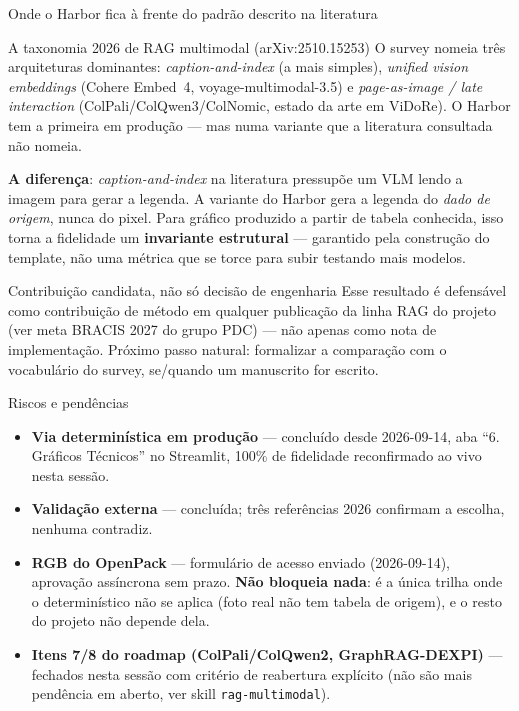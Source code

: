 \documentclass{beamer}
\newenvironment{numerobloco}[1]{\begin{block}{#1}}{\end{block}}
\newenvironment{decisaobloco}[1]{\begin{alertblock}{#1}}{\end{alertblock}}
\begin{document}
\begin{frame}{Onde o Harbor fica à frente do padrão descrito na literatura}
  \small
  \begin{numerobloco}{A taxonomia 2026 de RAG multimodal (arXiv:2510.15253)}
    O survey nomeia três arquiteturas dominantes: \emph{caption-and-index} (a mais simples),
    \emph{unified vision embeddings} (Cohere Embed~4, voyage-multimodal-3.5) e
    \emph{page-as-image / late interaction} (ColPali/ColQwen3/ColNomic, estado da arte em
    ViDoRe). O Harbor tem a primeira em produção — mas numa variante que a literatura
    consultada não nomeia.
  \end{numerobloco}

  \pause
  \textbf{A diferença}: \emph{caption-and-index} na literatura pressupõe um VLM lendo a
  imagem para gerar a legenda. A variante do Harbor gera a legenda do \emph{dado de origem},
  nunca do pixel. Para gráfico produzido a partir de tabela conhecida, isso torna a
  fidelidade um \textbf{invariante estrutural} — garantido pela construção do template, não
  uma métrica que se torce para subir testando mais modelos.

  \pause
  \begin{decisaobloco}{Contribuição candidata, não só decisão de engenharia}
    Esse resultado é defensável como contribuição de método em qualquer publicação da linha
    RAG do projeto (ver meta BRACIS 2027 do grupo PDC) — não apenas como nota de
    implementação. Próximo passo natural: formalizar a comparação com o vocabulário do
    survey, se/quando um manuscrito for escrito.
  \end{decisaobloco}
\end{frame}

\begin{frame}{Riscos e pendências}
  \begin{itemize}
    \item[\textcolor{green!50!black}{$\bullet$}] \textbf{Via determinística em produção} —
      concluído desde 2026-09-14, aba ``6. Gráficos Técnicos'' no Streamlit, 100\% de
      fidelidade reconfirmado ao vivo nesta sessão.
    \item[\textcolor{green!50!black}{$\bullet$}] \textbf{Validação externa} — concluída;
      três referências 2026 confirmam a escolha, nenhuma contradiz.
    \item[\textcolor{orange!80!black}{$\bullet$}] \textbf{RGB do OpenPack} — formulário de
      acesso enviado (2026-09-14), aprovação assíncrona sem prazo. \textbf{Não bloqueia
      nada}: é a única trilha onde o determinístico não se aplica (foto real não tem tabela
      de origem), e o resto do projeto não depende dela.
    \item[\textcolor{orange!80!black}{$\bullet$}] \textbf{Itens 7/8 do roadmap
      (ColPali/ColQwen2, GraphRAG-DEXPI)} — fechados nesta sessão com critério de
      reabertura explícito (não são mais pendência em aberto, ver skill
      \texttt{rag-multimodal}).
  \end{itemize}
\end{frame}
\end{document}
